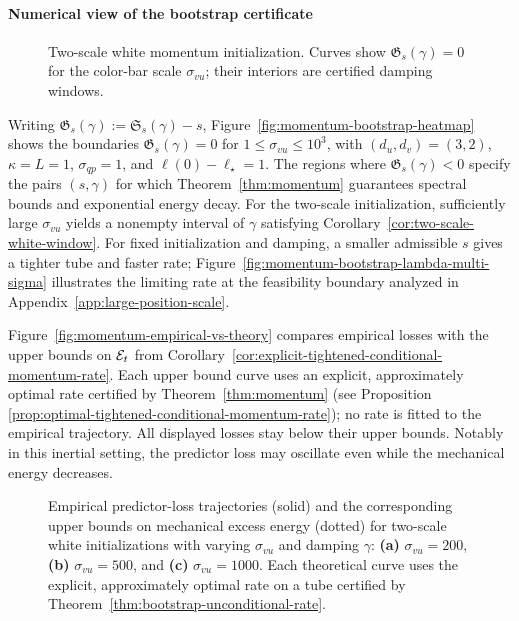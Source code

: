 \paragraph{Numerical view of the bootstrap certificate}
\begin{figure}
  \vspace{-1.5em}
\centering
{}
\footnotesize
\captionsetup{font=footnotesize,skip=2pt}
\caption{Two-scale white momentum initialization. Curves show
$\mathfrak G_s(\gamma)=0$ for the color-bar scale $\sigma_{vu}$;
their interiors are certified damping windows.}
\label{fig:momentum-bootstrap-heatmap}\label{fig:momentum-window}
\vspace{-14pt}
\end{figure}
Writing $\mathfrak G_s(\gamma):=\mathfrak S_s(\gamma)-s$, Figure~\ref{fig:momentum-bootstrap-heatmap} shows the boundaries
$\mathfrak G_s(\gamma)=0$ for $1\le\sigma_{vu}\le10^3$, with $(d_u,d_v)=(3,2)$,
$\kappa=L=1$, $\sigma_{qp}=1$, and $\ell(0)-\ell_\star=1$.
The regions where $\mathfrak G_s(\gamma)<0$ specify the pairs $(s,\gamma)$ for which Theorem~\ref{thm:momentum} guarantees spectral bounds and exponential energy decay.
For the two-scale initialization, sufficiently large $\sigma_{vu}$ yields a nonempty interval of $\gamma$ satisfying Corollary~\ref{cor:two-scale-white-window}.
For fixed initialization and damping, a smaller admissible $s$ gives a
tighter tube and faster rate; Figure~\ref{fig:momentum-bootstrap-lambda-multi-sigma}
illustrates the limiting rate at the feasibility boundary analyzed in
Appendix~\ref{app:large-position-scale}.

Figure~\ref{fig:momentum-empirical-vs-theory} compares empirical losses with the upper bounds on $\mathcal E_t$ from Corollary~\ref{cor:explicit-tightened-conditional-momentum-rate}.
Each upper bound curve uses an explicit, approximately optimal rate certified by Theorem~\ref{thm:momentum} (see Proposition \ref{prop:optimal-tightened-conditional-momentum-rate}); no rate is fitted
to the empirical trajectory. All displayed losses stay below their upper bounds.
Notably in this inertial setting, the predictor loss may oscillate even while the mechanical energy decreases.

\begin{figure}[!htbp]
\centering
{}
\captionsetup{font=footnotesize,skip=2pt}
\caption{
Empirical predictor-loss trajectories (solid) and the corresponding upper bounds
on mechanical excess energy (dotted) for two-scale white initializations with varying
\(\sigma_{vu}\) and damping \(\gamma\): \textbf{(a)} $\sigma_{vu}=200$,
\textbf{(b)} $\sigma_{vu}=500$, and \textbf{(c)} $\sigma_{vu}=1000$.
Each theoretical curve uses the explicit, approximately optimal rate on a tube certified by
Theorem~\ref{thm:bootstrap-unconditional-rate}.
}
\vspace{-1em}
\label{fig:momentum-empirical-vs-theory}\label{fig:momentum-envelopes}
\end{figure}
\WFclear

